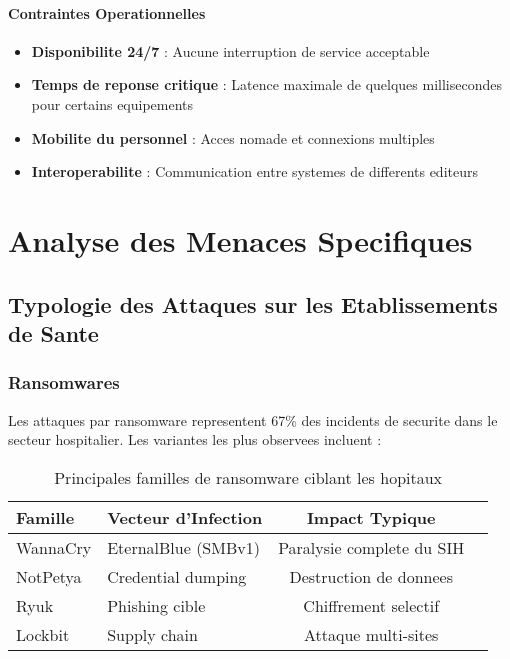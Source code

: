\paragraph{Contraintes Operationnelles}
\begin{itemize}
    \item \textbf{Disponibilite 24/7} : Aucune interruption de service acceptable
    \item \textbf{Temps de reponse critique} : Latence maximale de quelques millisecondes pour certains equipements
    \item \textbf{Mobilite du personnel} : Acces nomade et connexions multiples
    \item \textbf{Interoperabilite} : Communication entre systemes de differents editeurs
\end{itemize}


\section{Analyse des Menaces Specifiques}

\subsection{Typologie des Attaques sur les Etablissements de Sante}

\subsubsection{Ransomwares}

Les attaques par ransomware representent 67\% des incidents de securite dans le secteur hospitalier. Les variantes les plus observees incluent :

\begin{table}[H]
    \centering
    \caption{Principales familles de ransomware ciblant les hopitaux}
    \begin{tabular}{|l|l|c|l|}
        \hline
        \textbf{Famille} & \textbf{Vecteur d'Infection} & \textbf{Impact Typique}   \\
        \hline
        WannaCry         & EternalBlue (SMBv1)          & Paralysie complete du SIH \\
        \hline
        NotPetya         & Credential dumping           & Destruction de donnees    \\
        \hline
        Ryuk             & Phishing cible               & Chiffrement selectif      \\
        \hline
        Lockbit          & Supply chain                 & Attaque multi-sites       \\
        \hline
    \end{tabular}
\end{table}

